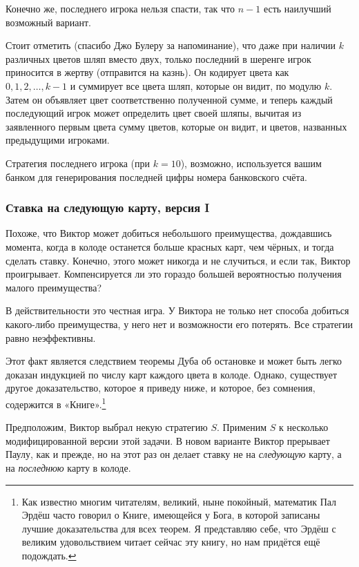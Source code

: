 Конечно же, последнего игрока нельзя спасти, так что $n-1$ есть наилучший возможный вариант.
\heart

Стоит отметить (спасибо Джо Булеру %
за напоминание), что даже при наличии $k$ различных цветов шляп вместо двух, только последний в шеренге игрок приносится в жертву (отправится на казнь).
Он кодирует цвета как $0, 1, 2, \dots, k-1$ и суммирует все цвета шляп, которые он видит, по модулю $k$.
Затем он объявляет цвет соответственно полученной сумме, и теперь каждый последующий игрок может определить цвет своей шляпы, вычитая из заявленного первым цвета сумму цветов, которые он видит, и цветов, названных предыдущими игроками.

Стратегия последнего игрока (при $k=10$), возможно, используется вашим банком для генерирования последней цифры номера банковского счёта.

\subsubsection*{Ставка на следующую карту, версия I}%

Похоже, что Виктор может добиться небольшого преимущества, дождавшись момента, когда в колоде останется больше красных карт, чем чёрных, и тогда сделать ставку.
Конечно, этого может никогда и не случиться, и если так, Виктор проигрывает.
Компенсируется ли это гораздо большей вероятностью получения малого преимущества?

В действительности это честная игра.
У Виктора не только нет способа добиться какого-либо преимущества, у него нет и возможности его потерять.
Все стратегии равно неэффективны.

Этот факт является следствием теоремы Дуба об остановке %
и может быть легко доказан индукцией по числу карт каждого цвета в колоде.
Однако, существует другое доказательство, которое я приведу ниже, и которое, без сомнения, содержится в «Книге».\footnote{Как известно многим читателям, великий, ныне покойный, математик Пал Эрдёш часто говорил о Книге, имеющейся у Бога, в которой записаны лучшие доказательства для всех теорем.
Я представляю себе, что Эрдёш с великим удовольствием читает сейчас эту книгу, но нам придётся ещё подождать.}

Предположим, Виктор выбрал некую стратегию $S$.
Применим $S$ к несколько модифицированной версии этой задачи.
В новом варианте Виктор прерывает Паулу, как и прежде, но на этот раз он делает ставку не на \emph{следующую} карту, а на \emph{последнюю} карту в колоде.

